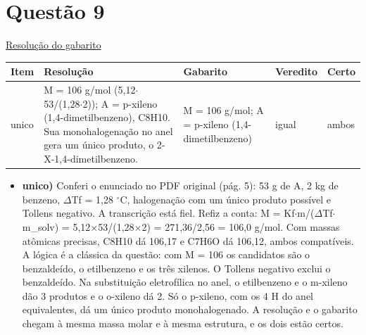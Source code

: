 \documentclass{article}%
\begin{document}
\section*{Questão 9}%
\href{https://poliedroresolve.sistemapoliedro.com.br/vestibulares/ime/2027/ime-2-fase-dia-3-28-10-2026-2-fase-dia-3/dissertativa-9-quimica-2-fase-dia-3-ime-2027}{Resolução do gabarito}\par\smallskip%
\begin{longtable}{@{}p{} p{} p{} p{} p{}@{}}\toprule Item & Resolução & Gabarito & Veredito & Certo \\ \midrule
unico & M = 106 g/mol (5,12$\cdot$53/(1,28$\cdot$2)); A = p{-}xileno (1,4{-}dimetilbenzeno), C8H10. Sua monohalogenação no anel gera um único produto, o 2{-}X{-}1,4{-}dimetilbenzeno. & M = 106 g/mol; A = p{-}xileno (1,4{-}dimetilbenzeno) & igual & ambos \\
\bottomrule\end{longtable}%
\begin{itemize}%
\item%
\textbf{unico)} Conferi o enunciado no PDF original (pág. 5): 53 g de A, 2 kg de benzeno, $\Delta$Tf = 1,28 $^\circ$C, halogenação com um único produto possível e Tollens negativo. A transcrição está fiel. Refiz a conta: M = Kf$\cdot$m/($\Delta$Tf$\cdot$m\_solv) = 5,12$\times$53/(1,28$\times$2) = 271,36/2,56 = 106,0 g/mol. Com massas atômicas precisas, C8H10 dá 106,17 e C7H6O dá 106,12, ambos compatíveis. A lógica é a clássica da questão: com M = 106 os candidatos são o benzaldeído, o etilbenzeno e os três xilenos. O Tollens negativo exclui o benzaldeído. Na substituição eletrofílica no anel, o etilbenzeno e o m{-}xileno dão 3 produtos e o o{-}xileno dá 2. Só o p{-}xileno, com os 4 H do anel equivalentes, dá um único produto monohalogenado. A resolução e o gabarito chegam à mesma massa molar e à mesma estrutura, e os dois estão certos.%
\end{itemize}%
\end{document}
